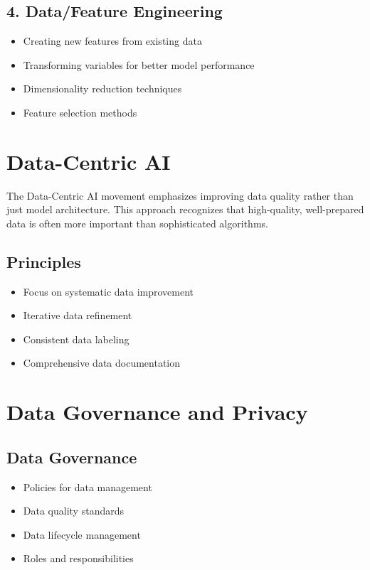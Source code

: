 \documentclass[12pt]{article}
\begin{document}
\subsection{4. Data/Feature Engineering}
\begin{itemize}
    \item Creating new features from existing data
    \item Transforming variables for better model performance
    \item Dimensionality reduction techniques
    \item Feature selection methods
\end{itemize}

\section{Data-Centric AI}

\begin{tcolorbox}[colback=yellow!5!white,colframe=yellow!75!black,title=Data-Centric Approach]
The Data-Centric AI movement emphasizes improving data quality rather than just model architecture. This approach recognizes that high-quality, well-prepared data is often more important than sophisticated algorithms.
\end{tcolorbox}

\subsection{Principles}
\begin{itemize}
    \item Focus on systematic data improvement
    \item Iterative data refinement
    \item Consistent data labeling
    \item Comprehensive data documentation
\end{itemize}

\section{Data Governance and Privacy}

\subsection{Data Governance}
\begin{itemize}
    \item Policies for data management
    \item Data quality standards
    \item Data lifecycle management
    \item Roles and responsibilities
\end{itemize}
\end{document}
